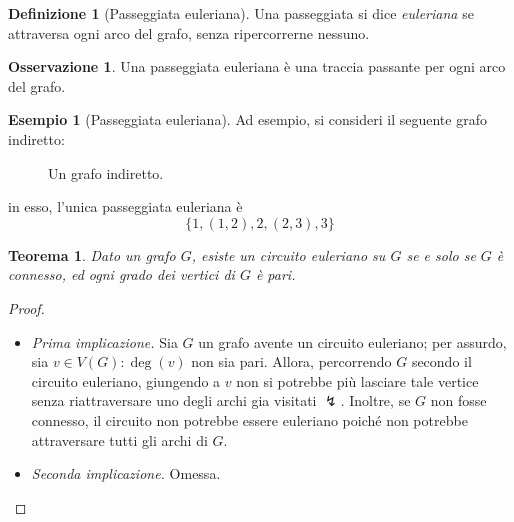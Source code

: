 \documentclass[14pt]{extreport}
\newtheorem{theorem}{Teorema}[subsection]
\theoremstyle{definition}
\newtheorem{definition}{Definizione}[subsection]
\theoremstyle{definition}
\newtheorem{remark}{Osservazione}[subsection]
\newtheorem{example}{Esempio}[subsection]
\begin{document}
\begin{definition}[Passeggiata euleriana]
    Una passeggiata si dice \textit{euleriana} se attraversa ogni arco del grafo, senza ripercorrerne nessuno.
\end{definition}

\begin{remark}
    Una passeggiata euleriana è una traccia passante per ogni arco del grafo.
\end{remark}

\begin{example}[Passeggiata euleriana]
    Ad esempio, si consideri il seguente grafo indiretto:

    \begin{figure}[H]
        \centering
        \caption{Un grafo indiretto.}
    \end{figure}

    in esso, l'unica passeggiata euleriana è $$\{1, (1,2), 2, (2,3), 3\}$$
\end{example}

\begin{theorem}
    Dato un grafo $G$, esiste un circuito euleriano su $G$ se e solo se $G$ è connesso, ed ogni grado dei vertici di $G$ è pari.
\end{theorem}

\begin{proof}
    \hspace{0.7cm}
    \begin{itemize}
        \item[] \textit{Prima implicazione.} Sia $G$ un grafo avente un circuito euleriano; per assurdo, sia $v \in V(G) : \deg(v)$ non sia pari. Allora, percorrendo $G$ secondo il circuito euleriano, giungendo a $v$ non si potrebbe più lasciare tale vertice senza riattraversare uno degli archi gia visitati $\lightning$. Inoltre, se $G$ non fosse connesso, il circuito non potrebbe essere euleriano poiché non potrebbe attraversare tutti gli archi di $G$.
        \item[] \textit{Seconda implicazione.} Omessa.
    \end{itemize}
\end{proof}
\end{document}
